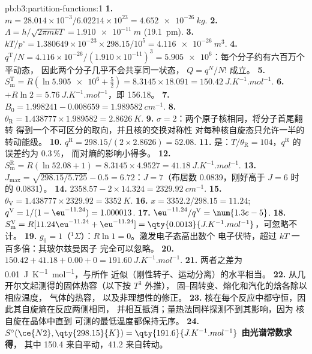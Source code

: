 \begin{solution}{pb:b3:partition-functions:1}
\textbf{1.} $m = 28.014\times10^{-3}/6.02214\times10^{23} = \qty{4.652e-26}{kg}$.
\textbf{2.} $\Lambda = h/\sqrt{2\pi mkT} = \qty{1.910e-11}{m}$ (\qty{19.1}{pm}).
\textbf{3.} $kT/p^\circ = 1.380649\times10^{-23} \times 298.15/10^5 = \qty{4.116e-26}{m^3}$.
\textbf{4.} $q^{\mathrm T}/N = 4.116\times10^{-26}/(1.910\times10^{-11})^3 = \num{5.905e6}$：每个分子约有六百万个平动态，
因此两个分子几乎不会共享同一状态，
$Q = q^N/N!$ 成立。
\textbf{5.} $S^{\mathrm T}_{\mathrm m} = R(\ln\num{5.905e6} + \frac52) = 8.3145 \times 18.091 = \qty{150.42}{J.K^{-1}.mol^{-1}}$.
\textbf{6.} $+R\ln2 = \qty{5.76}{J.K^{-1}.mol^{-1}}$，即 \num{156.18}。
\textbf{7.} $B_0 = 1.998241 - 0.008659 = \qty{1.989582}{cm^{-1}}$.
\textbf{8.} $\theta_{\mathrm R} = 1.438777 \times 1.989582 = \qty{2.8626}{K}$.
\textbf{9.} $\sigma = 2$：两个原子核相同，将分子首尾翻转
得到一个不可区分的取向，并且核的交换对称性
对每种核自旋态只允许一半的转动能级。
\textbf{10.} $q^{\mathrm R} = 298.15/(2 \times 2.8626) = 52.08$.
\textbf{11.} 是：$T/\theta_{\mathrm R} = 104$，$q^{\mathrm R}$ 的误差约为 0.3\,\%，
而对熵的影响小得多。
\textbf{12.} $S^{\mathrm R}_{\mathrm m} = R(\ln52.08 + 1) = 8.3145 \times 4.9527 = \qty{41.18}{J.K^{-1}.mol^{-1}}$.
\textbf{13.} $J_{\max} = \sqrt{298.15/5.725} - 0.5 = 6.72$：$J = 7$（布居数 0.0839，刚好高于
$J = 6$ 时的 0.0831）。
\textbf{14.} $2358.57 - 2 \times 14.324 = \qty{2329.92}{cm^{-1}}$.
\textbf{15.} $\theta_{\mathrm V} = 1.438777 \times 2329.92 = \qty{3352}{K}$.
\textbf{16.} $x = 3352.2/298.15 = 11.24$; $q^{\mathrm V} = 1/(1 - \eu^{-11.24}) = 1.000013$.
\textbf{17.} $\eu^{-11.24}/q^{\mathrm V} = \num{1.3e-5}$.
\textbf{18.} $S^{\mathrm V}_{\mathrm m} = R[11.24\eu^{-11.24} + \eu^{-11.24}] = \qty{0.0013}{J.K^{-1}.mol^{-1}}$，可忽略不计。
\textbf{19.} $g_0 = 1$（${}^1\Sigma$）：$R\ln1 = 0$。激发电子态高出数个
电子伏特，超过 $kT$ 一百多倍：其玻尔兹曼因子
完全可以忽略。
\textbf{20.} $150.42 + 41.18 + 0.00 + 0 = \qty{191.60}{J.K^{-1}.mol^{-1}}$.
\textbf{21.} 两者之差为 \qty{0.01}{J.K^{-1}.mol^{-1}}，与所作
近似（刚性转子、运动分离）的水平相当。
\textbf{22.} 从几开尔文起测得的固体热容（以下按 $T^3$ 外推），
固–固转变、熔化和汽化的焓各除以相应温度，
气体的热容，
以及非理想性的修正。
\textbf{23.} 核在每个反应中都守恒，因此其自旋熵在反应两侧相同，
并相互抵消；量热法同样探测不到其影响，因为
核自旋在晶体中直到
可测的最低温度都保持无序。
\textbf{24.} \textbf{$S^\circ(\ce{N2}, \qty{298.15}{K}) = \qty{191.6}{J.K^{-1}.mol^{-1}}$ 由光谱常数求得}，
其中 150.4 来自平动，41.2 来自转动。
\end{solution}
